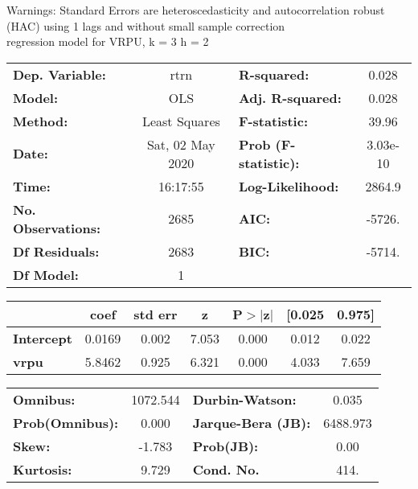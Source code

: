Warnings: \newline
 [1] Standard Errors are heteroscedasticity and autocorrelation robust (HAC) using 1 lags and without small sample correction\\ 

regression model for VRPU, k = 3 h = 2\begin{center}
\begin{tabular}{lclc}
\toprule
\textbf{Dep. Variable:}    &       rtrn       & \textbf{  R-squared:         } &     0.028   \\
\textbf{Model:}            &       OLS        & \textbf{  Adj. R-squared:    } &     0.028   \\
\textbf{Method:}           &  Least Squares   & \textbf{  F-statistic:       } &     39.96   \\
\textbf{Date:}             & Sat, 02 May 2020 & \textbf{  Prob (F-statistic):} &  3.03e-10   \\
\textbf{Time:}             &     16:17:55     & \textbf{  Log-Likelihood:    } &    2864.9   \\
\textbf{No. Observations:} &        2685      & \textbf{  AIC:               } &    -5726.   \\
\textbf{Df Residuals:}     &        2683      & \textbf{  BIC:               } &    -5714.   \\
\textbf{Df Model:}         &           1      & \textbf{                     } &             \\
\bottomrule
\end{tabular}
\begin{tabular}{lcccccc}
                   & \textbf{coef} & \textbf{std err} & \textbf{z} & \textbf{P$> |$z$|$} & \textbf{[0.025} & \textbf{0.975]}  \\
\midrule
\textbf{Intercept} &       0.0169  &        0.002     &     7.053  &         0.000        &        0.012    &        0.022     \\
\textbf{vrpu}      &       5.8462  &        0.925     &     6.321  &         0.000        &        4.033    &        7.659     \\
\bottomrule
\end{tabular}
\begin{tabular}{lclc}
\textbf{Omnibus:}       & 1072.544 & \textbf{  Durbin-Watson:     } &    0.035  \\
\textbf{Prob(Omnibus):} &   0.000  & \textbf{  Jarque-Bera (JB):  } & 6488.973  \\
\textbf{Skew:}          &  -1.783  & \textbf{  Prob(JB):          } &     0.00  \\
\textbf{Kurtosis:}      &   9.729  & \textbf{  Cond. No.          } &     414.  \\
\bottomrule
\end{tabular}
\end{center}

